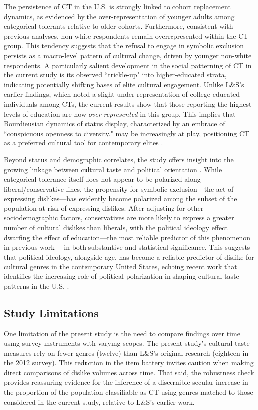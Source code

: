 \documentclass[12pt]{article}
\begin{document}
The persistence of CT in the U.S. is strongly linked to cohort replacement dynamics, as evidenced by the over-representation of younger adults among categorical tolerants relative to older cohorts. Furthermore, consistent with previous analyses, non-white respondents remain overrepresented within the CT group. This tendency suggests that the refusal to engage in symbolic exclusion persists as a macro-level pattern of cultural change, driven by younger non-white respondents. A particularly salient development in the social patterning of CT in the current study is its observed ``trickle-up" into higher-educated strata, indicating potentially shifting bases of elite cultural engagement. Unlike L\&S's earlier findings, which noted a slight under-representation of college-educated individuals among CTs, the current results show that those reporting the highest levels of education are now \textit{over-represented} in this group. This implies that Bourdieusian dynamics of status display, characterized by an embrace of ``conspicuous openness to diversity," may be increasingly at play, positioning CT as a preferred cultural tool for contemporary elites \citep{jarness2017im-001, ollivier2008modes-96f}.

Beyond status and demographic correlates, the study offers insight into the growing linkage between cultural taste and political orientation \citep{rawlings2023polarization-0af}. While categorical tolerance itself does not appear to be polarized along liberal/conservative lines, the propensity for symbolic exclusion---the act of expressing dislikes---has evidently become polarized among the subset of the population at risk of expressing dislikes. After adjusting for other sociodemographic factors, conservatives are more likely to express a greater number of cultural dislikes than liberals, with the political ideology effect dwarfing the effect of education---the most reliable predictor of this phenomenon in previous work \citep{bryson1996anything-311}---in both substantive and statistical significance. This suggests that political ideology, alongside age, has become a reliable predictor of dislike for cultural genres in the contemporary United States, echoing recent work that identifies the increasing role of political polarization in shaping cultural taste patterns in the U.S. \citep{rawlings2023polarization-0af}.

\subsection*{Study Limitations}
One limitation of the present study is the need to compare findings over time using survey instruments with varying scopes. The present study's cultural taste measures rely on fewer genres (twelve) than L\&S's original research (eighteen in the 2012 survey). This reduction in the item battery invites caution when making direct comparisons of dislike volumes across time. That said, the robustness check provides reassuring evidence for the inference of a discernible secular increase in the proportion of the population classifiable as CT using genres matched to those considered in the current study, relative to L\&S's earlier work. 
\end{document}
